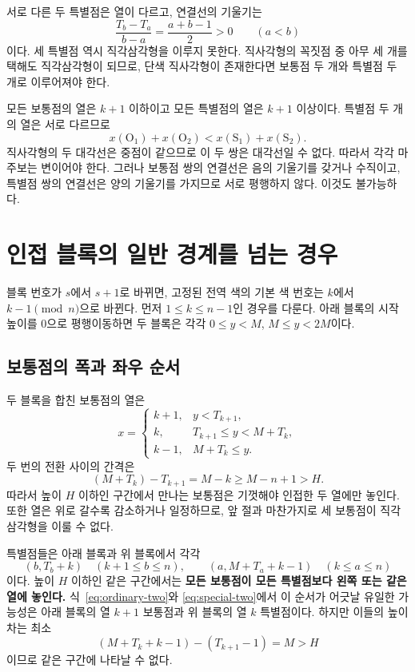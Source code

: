 \documentclass[a4paper,11pt]{article}
\theoremstyle{definition}
\newcommand{\OO}{\mathrm{O}}
\newcommand{\SSp}{\mathrm{S}}
\begin{document}
서로 다른 두 특별점은 열이 다르고, 연결선의 기울기는
\begin{equation}\label{eq:within-slope}
  \frac{T_b-T_a}{b-a}=\frac{a+b-1}{2}>0
  \qquad(a<b)
\end{equation}
이다. 세 특별점 역시 직각삼각형을 이루지 못한다.
직사각형의 꼭짓점 중 아무 세 개를 택해도 직각삼각형이 되므로,
단색 직사각형이 존재한다면 보통점 두 개와 특별점 두 개로 이루어져야 한다.

모든 보통점의 열은 $k+1$ 이하이고 모든 특별점의 열은 $k+1$ 이상이다.
특별점 두 개의 열은 서로 다르므로
\[
  x(\OO_1)+x(\OO_2)<x(\SSp_1)+x(\SSp_2).
\]
직사각형의 두 대각선은 중점이 같으므로 이 두 쌍은 대각선일 수 없다.
따라서 각각 마주보는 변이어야 한다. 그러나 보통점 쌍의 연결선은
음의 기울기를 갖거나 수직이고, 특별점 쌍의 연결선은 양의 기울기를
가지므로 서로 평행하지 않다. 이것도 불가능하다.

\section{인접 블록의 일반 경계를 넘는 경우}\label{sec:ordinary-boundary}

블록 번호가 $s$에서 $s+1$로 바뀌면, 고정된 전역 색의 기본 색 번호는
$k$에서 $k-1\pmod n$으로 바뀐다.
먼저 $1\le k\le n-1$인 경우를 다룬다.
아래 블록의 시작 높이를 $0$으로 평행이동하면 두 블록은 각각
$0\le y<M$, $M\le y<2M$이다.

\subsection{보통점의 폭과 좌우 순서}

두 블록을 합친 보통점의 열은
\begin{equation}\label{eq:ordinary-two}
 x=\begin{cases}
  k+1,&y<T_{k+1},\\
  k,&T_{k+1}\le y<M+T_k,\\
  k-1,&M+T_k\le y.
 \end{cases}
\end{equation}
두 번의 전환 사이의 간격은
\[
  (M+T_k)-T_{k+1}=M-k\ge M-n+1>H.
\]
따라서 높이 $H$ 이하인 구간에서 만나는 보통점은 기껏해야 인접한
두 열에만 놓인다. 또한 열은 위로 갈수록 감소하거나 일정하므로,
앞 절과 마찬가지로 세 보통점이 직각삼각형을 이룰 수 없다.

특별점들은 아래 블록과 위 블록에서 각각
\begin{equation}\label{eq:special-two}
  (b,T_b+k)\quad(k+1\le b\le n),\qquad
  (a,M+T_a+k-1)\quad(k\le a\le n)
\end{equation}
이다. 높이 $H$ 이하인 같은 구간에서는 \textbf{모든 보통점이 모든
특별점보다 왼쪽 또는 같은 열에 놓인다.}
식~\eqref{eq:ordinary-two}와 \eqref{eq:special-two}에서 이 순서가
어긋날 유일한 가능성은 아래 블록의 열 $k+1$ 보통점과 위 블록의
열 $k$ 특별점이다. 하지만 이들의 높이 차는 최소
\[
 (M+T_k+k-1)-(T_{k+1}-1)=M>H
\]
이므로 같은 구간에 나타날 수 없다.
\end{document}
